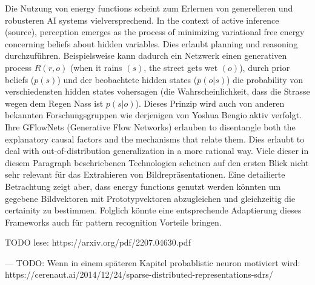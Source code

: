 Die Nutzung von energy functions scheint zum Erlernen von generelleren und robusteren AI systems vielversprechend. In the context of active inference (source), perception emerges as the process of minimizing variational free energy concerning beliefs about hidden variables. Dies erlaubt planning und reasoning durchzuführen. Beispielsweise kann dadurch ein Netzwerk einen generativen process $R(r,o)$ (when it rains $(s)$, the street gets wet $(o)$), durch prior beliefs ($p(s)$) und der beobachtete hidden states ($p(o|s)$) die probability von verschiedensten hidden states vohersagen (die Wahrscheinlichkeit, dass die Strasse wegen dem Regen Nass ist $p(s|o)$). Dieses Prinzip wird auch von anderen bekannten Forschungsgruppen wie derjenigen von Yoshua Bengio aktiv verfolgt. Ihre GFlowNets (Generative Flow Networks) erlauben to disentangle both the explanatory causal factors and the mechanisms that relate them. Dies erlaubt to deal with out-of-distribution generalization in a more rational way. Viele dieser in diesem Paragraph beschriebenen Technologien scheinen auf den ersten Blick nicht sehr relevant für das Extrahieren von Bildrepräsentationen. Eine detailierte Betrachtung zeigt aber, dass energy functions genutzt werden könnten um gegebene Bildvektoren mit Prototypvektoren abzugleichen und gleichzeitig die certainity zu bestimmen. Folglich könnte eine entsprechende Adaptierung dieses Frameworks auch für pattern recognition Vorteile bringen.


TODO lese: https://arxiv.org/pdf/2207.04630.pdf



---
TODO: Wenn in einem späteren Kapitel probablistic neuron motiviert wird: https://cerenaut.ai/2014/12/24/sparse-distributed-representations-sdrs/
 





